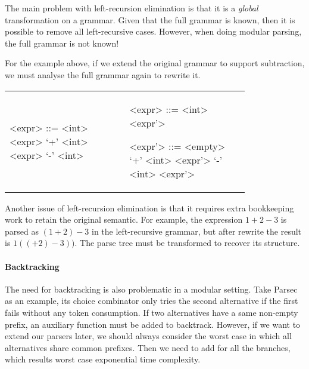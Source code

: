 The main problem with left-recursion elimination is that it is a \emph{global} transformation on a grammar. Given that the full grammar is known, then it is possible to remove all left-recursive cases. However, when doing modular parsing, the full grammar is not known!

For the example above, if we extend the original grammar to support subtraction, we must analyse the full grammar again to rewrite it.

\begin{tabular}{m{0.4\linewidth}m{0.4\linewidth}}
\setlength{\grammarindent}{5em}
\begin{grammar}
<expr> ::= <int> \alt <expr> `+' <int> \alt <expr> `-' <int>
\end{grammar}
&
\setlength{\grammarindent}{5em}
\begin{grammar}
<expr> ::= <int> <expr'>

<expr'> ::= <empty> \alt `+' <int> <expr'> \alt `-' <int> <expr'>
\end{grammar}
\end{tabular}

Another issue of left-recursion elimination is that it requires extra bookkeeping work to retain the original semantic. For example, the expression $1+2-3$ is parsed as $(1+2)-3$ in the left-recursive grammar, but after rewrite the result is $1((+2)-3))$. The parse tree must be transformed to recover its structure.


\paragraph{Backtracking} The need for backtracking is also problematic
in a modular setting. Take Parsec as an example, its choice
combinator only tries the second alternative if the first fails
without any token consumption. If two alternatives have a same
non-empty prefix, an auxiliary function  must be added
to backtrack. However, if we want to extend our parsers later, we
should always consider the worst case in which all alternatives share
common prefixes. Then we need to add  for all the
branches, which results worst case exponential time complexity.

